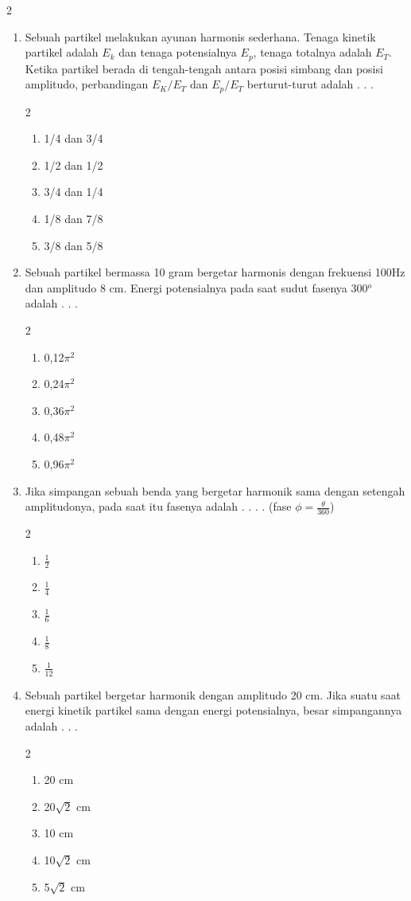 \documentclass[10pt,a4paper]{extarticle}
\newcommand{\pilgani}[1]{                            \vspace{-0.3cm}\begin{multicols}{2}
 \begin{enumerate}[label=\Alph*., itemsep=0pt,topsep=0pt,leftmargin=*,align=Center]#1                     \end{enumerate}
 \phantom{ini cuma sapi, wedus, dan ayam}
 \end{multicols}}
\begin{document}
\begin{multicols*}{2}
\begin{enumerate}
\item Sebuah partikel melakukan ayunan harmonis sederhana. Tenaga kinetik partikel adalah $E_k$ dan tenaga potensialnya $E_p$, tenaga totalnya adalah $E_T$. Ketika partikel berada di tengah-tengah antara posisi simbang dan posisi amplitudo, perbandingan $E_K/E_T$ dan $E_p/E_T$ berturut-turut adalah . . .
\pilgani{
   \item 1/4 dan 3/4
   \item 1/2 dan 1/2
   \item 3/4 dan 1/4
   \item 1/8 dan 7/8
   \item 3/8 dan 5/8
}
\vspace{3cm}

\item Sebuah partikel bermassa 10 gram bergetar harmonis dengan frekuensi 100Hz dan amplitudo 8 cm. Energi potensialnya pada saat sudut fasenya 300$^o$ adalah . . . 
\pilgani{
   \item 0,12$\pi^2$
   \item 0,24$\pi^2$
   \item 0,36$\pi^2$
   \item 0,48$\pi^2$
   \item 0,96$\pi^2$}
\vspace{3cm}

\item Jika simpangan sebuah benda yang bergetar harmonik sama dengan setengah amplitudonya, pada saat itu fasenya adalah  . . . .  (fase $\phi=\frac{\theta}{360}$)
\pilgani{
   \item $\frac{1}{2}$
   \item $\frac{1}{4}$
   \item $\frac{1}{6}$
   \item $\frac{1}{8}$
   \item $\frac{1}{12}$}
   \vspace{3cm}

   \item Sebuah partikel bergetar harmonik dengan amplitudo 20 cm. Jika suatu saat energi kinetik partikel sama dengan energi potensialnya, besar simpangannya adalah . . .
   \pilgani{
      \item 20 cm
      \item 20$\sqrt{2}$ cm
      \item 10 cm
      \item 10$\sqrt{2}$ cm
      \item 5$\sqrt{2}$ cm
   }
   \vspace{2cm}


\end{enumerate}
\end{multicols*}
\end{document}
